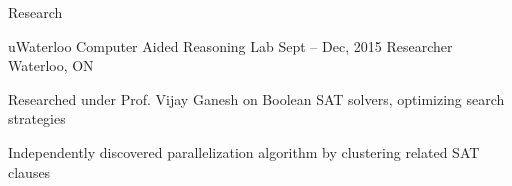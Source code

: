 \documentclass{resume} %
\begin{document}
\begin{rSection}{Research}
  \begin{rSubsection}{uWaterloo Computer Aided Reasoning Lab}
                     {Sept -- Dec, 2015}
                     {Researcher}
                     {Waterloo, ON}
    \item Researched under Prof. Vijay Ganesh on Boolean SAT solvers, optimizing
      search strategies
    \item Independently discovered parallelization algorithm by clustering
      related SAT clauses
  \end{rSubsection}
\end{rSection}

\end{document}
